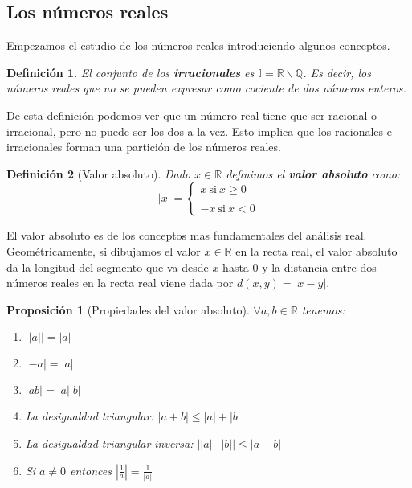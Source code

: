 \documentclass{article}
\newtheorem{prop}{Proposición}
\newtheorem{define}{Definición}
\begin{document}
\subsection{Los números reales}
Empezamos el estudio de los números reales introduciendo algunos conceptos.
\begin{define}
El conjunto de los \textbf{irracionales} es $\mathbb{I} = \mathbb{R} \smallsetminus \mathbb{Q}$. Es decir, los números reales que no se pueden expresar como cociente de dos números enteros.
\end{define}

De esta definición podemos ver que un número real tiene que ser racional o irracional, pero no puede ser los dos a la vez. Esto implica que los racionales e irracionales forman una partición de los números reales.

\begin{define}[Valor absoluto]
Dado $x \in \mathbb{R}$ definimos el \textbf{valor absoluto} como:
\begin{equation}
|x| = \left\lbrace
\begin{array}{l}
x\ \text{si}\ x \geq 0 \\
\\
-x\ \text{si}\ x < 0
\end{array}
\right.
\end{equation}
\end{define}
El valor absoluto es de los conceptos mas fundamentales del análisis real. Geométricamente, si dibujamos el valor $x \in \mathbb{R}$ en la recta real, el valor absoluto da la longitud del segmento que va desde $x$ hasta $0$ y la distancia entre dos números reales en la recta real viene dada por $d(x, y) = |x-y|$.
\begin{prop}[Propiedades del valor absoluto]
$\forall a,b \in \mathbb{R}$ tenemos:
\begin{enumerate}
\item
$||a|| = |a|$
\item
$|-a| = |a|$
\item
$|ab| = |a||b|$
\item
La desigualdad triangular: $|a+b| \leq |a| + |b|$
\item
La desigualdad triangular inversa: $||a|-|b|| \leq |a-b|$
\item
Si $a\neq 0$ entonces $|\frac{1}{a}| = \frac{1}{|a|}$
\end{enumerate}
\end{prop}
\end{document}
